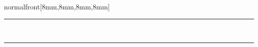 \documentclass[
    coverwidth=160mm,
    coverheight=227mm,
    spinewidth=9mm,
    markcolor=black,
    marklength=8mm,
    trimmed=true,
    ]
    {bookcover}
\begin{document}
\begin{bookcover}
\begin{bookcoverelement}{normal}{front}[8mm,8mm,8mm,8mm]
            \par\noindent\rule{72mm}{0.4pt}\\
            {\bdivolume{\autorVier}}
            \begin{center}
                \bdicover \artikelVier 
            \end{center}
            \bigskip

            \hspace{72mm}\noindent\rule{72mm}{0.4pt}\\\bigskip
            \hfill{\bdivolume{\autorFuenf}}
            \begin{center}
                \bdicover \artikelFuenf
            \end{center}
            
        \end{bookcoverelement}


\end{bookcover}
\end{document}
